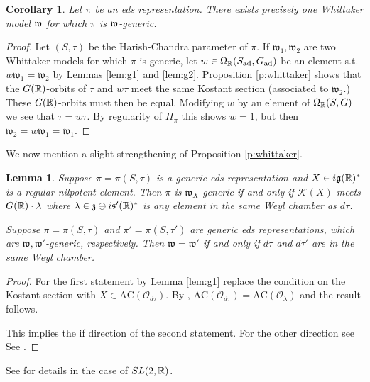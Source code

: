 \documentclass{article}
\newtheorem{lem}[thm]{Lemma}
\newtheorem{cor}[thm]{Corollary}
\theoremstyle{definition}
\numberwithin{equation}{section}
\renewcommand{\-}{\hyp{}}
\newcommand{\s}{\mathfrak s}
\newcommand{\g}{\mathfrak g}
\renewcommand{\O}{\mathcal O}
\newcommand{\K}{\mathcal K}
\newcommand{\w}{\mathfrak w}
\newcommand{\AC}{\mathrm{AC}}
\begin{document}
\begin{cor}
	Let $\pi$ be an eds representation. There exists precisely one Whittaker model $\mathfrak{w}$ for which $\pi$ is $\mathfrak{w}$-generic.
\end{cor}
\begin{proof}
	Let $(S,\tau)$ be the Harish-Chandra parameter of $\pi$.
 If $\w_1,\w_2$ are two Whittaker models for which $\pi$ is generic, let $w \in \Omega_{\mathbb{R}}(S_{\textrm{ad}},G_{\textrm{ad}})$ be an element s.t. $w\w_1=\w_2$ by Lemmas \ref{lem:g1} and \ref{lem:g2}. Proposition \ref{p:whittaker} shows that the $G(\mathbb{R})$-orbits of $\tau$ and $w\tau$ meet the same Kostant section (associated to $\w_2$.) These $G(\mathbb{R})$-orbits must then be equal. Modifying $w$ by an element of $\Omega_{\mathbb{R}}(S,G)$ we see that $\tau=w\tau$. By regularity of $H_\pi$ this shows $w=1$, but then $\w_2=w\w_1=\w_1$.
\end{proof}

We now mention  a slight strengthening of Proposition \ref{p:whittaker}. 

\begin{lem} \label{lem:g2'}
Suppose $\pi=\pi(S,\tau)$ is a generic eds representation and $X\in i\g(\R)^*$ is a regular nilpotent element.
Then $\pi$ is $\w_X$-generic if and only if
$\K(X)$ meets $G(\mathbb{R})\cdot\lambda$ where $\lambda\in \mf{z} \oplus i\s'(\R)^*$ is any element in the same Weyl chamber as $d\tau$.

Suppose $\pi=\pi(S,\tau)$ and $\pi'=\pi(S,\tau')$ are generic eds representations, which are $\w, \w'$-generic, respectively.
Then $\w=\w'$ if and only if $d\tau$ and $d\tau'$ are in the same Weyl chamber. 
\end{lem}

\begin{proof}
For the first statement by Lemma \ref{lem:g1} replace the condition on the Kostant section with $X\in \AC(\O_{d\tau})$.
By \cite[Proposition 3.9]{adams_afgoustidis_whittaker}, $\AC(\O_{d\tau})=\AC(\O_\lambda)$ and the result follows.

  This implies the if direction of the second statement. For the other direction see
  See \cite[Corollary  3.12]{adams_afgoustidis_whittaker}.
\end{proof}

See \cite[Appendix]{adams_afgoustidis_whittaker} for details  in the case of $SL(2,\mathbb{R})$.
\end{document}
